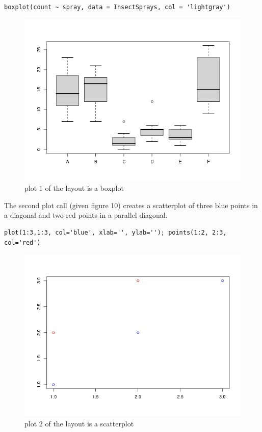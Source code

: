 \documentclass[]{article}
\begin{document}
\begin{verbatim}
boxplot(count ~ spray, data = InsectSprays, col = 'lightgray')
\end{verbatim}



\begin{center}
\begin{figure}
\includegraphics{boxplot}
\caption{plot 1 of the layout is a boxplot}
\end{figure}
\end{center}

\indent The second plot call (given figure 10) creates a scatterplot of three blue points in a diagonal and two red points in a parallel diagonal. 

\begin{verbatim}
plot(1:3,1:3, col='blue', xlab='', ylab=''); points(1:2, 2:3, col='red')
\end{verbatim}

\begin{center}
\begin{figure}
\includegraphics{scatter}
\caption{plot 2 of the layout is a scatterplot}
\end{figure}
\end{center}
\end{document}
